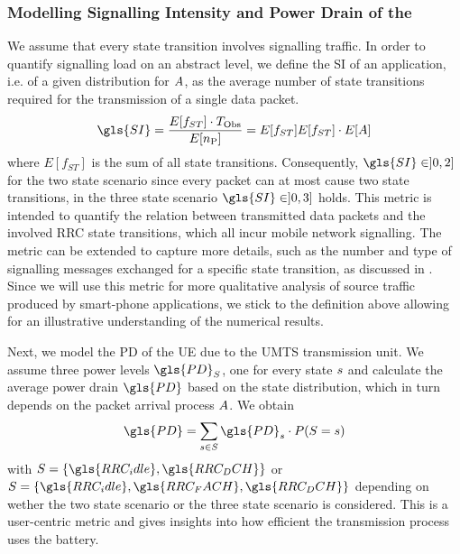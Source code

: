 \subsubsection*{Modelling Signalling Intensity and Power Drain of the }\label{sec:network:performance_model:analytical_model:metrics}

\newcommand{\fStateTransitions}{E[f_{ST}]}

We assume that every state transition involves signalling traffic.
In order to quantify signalling load on an abstract level, we define the \gls{SI} of an application, i.e. of a given distribution for \(A\), as the average number of state transitions required for the transmission of a single data packet.
\begin{equation}
\gls{SI} = \frac{\fStateTransitions \cdot \ObservationInterval}{E[\NObservedPackets]}\\
= \fStateTransitions {E[f_{ST}] }\cdot E[\PacketIAT]
\label{eq::sigIntensity}
\end{equation}
where \(\fStateTransitions\) is the sum of all state transitions.
Consequently, \(\gls{SI} \in ]0,2]\) for the two state scenario since every packet can at most cause two state transitions, in the three state scenario \(\gls{SI} \in]0,3]\) holds.
This metric is intended to quantify the relation between transmitted data packets and the involved \gls{RRC} state transitions, which all incur mobile network signalling.
The metric can be extended to capture more details, such as the number and type of signalling messages exchanged for a specific state transition, as discussed in .
Since we will use this metric for more qualitative analysis of source traffic produced by smart-phone applications, we stick to the definition above allowing for an illustrative understanding of the numerical results.

Next, we model the \gls{PD} of the \gls{UE} due to the \gls{UMTS} transmission unit. 
We assume three power levels \(\gls{PD}_{\RRCState}\), one for every state \(s\) and calculate the average power drain \(\gls{PD}\) based on the state distribution, which in turn depends on the packet arrival process \(A\).
We obtain
\begin{equation}
\gls{PD} = \sum_{\RRCStateRealization\in\RRCState} \gls{PD}_{\RRCStateRealization} \cdot P(\RRCState=\RRCStateRealization)
\label{eq::powerdrain}
\end{equation}
with \(\RRCState = \{\gls{RRC_idle},\gls{RRC_DCH}\}\) or \(\RRCState = \{\gls{RRC_idle},\gls{RRC_FACH},\gls{RRC_DCH}\}\) depending on wether the two state scenario or the three state scenario is considered.
This is a user-centric metric and gives insights into how efficient the transmission process uses the battery. 